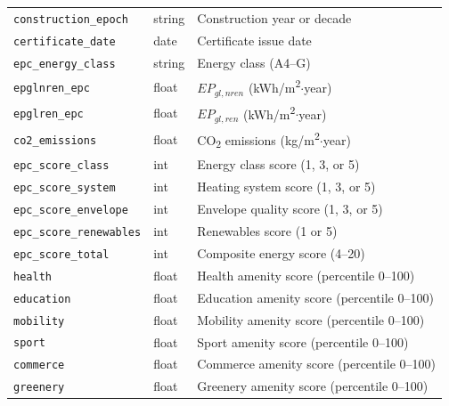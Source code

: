 \documentclass[runningheads,orivec]{llncs}
\begin{document}
\begin{table}[h]
\begin{tabularx}{\textwidth}{llX}
\texttt{construction\_epoch}         & string  & Construction year or decade \\
\texttt{certificate\_date}           & date    & Certificate issue date \\
\texttt{epc\_energy\_class}          & string  & Energy class (A4--G) \\
\texttt{epglnren\_epc}               & float   & $EP_{gl,nren}$ (kWh/m\textsuperscript{2}$\cdot$year) \\
\texttt{epglren\_epc}                & float   & $EP_{gl,ren}$ (kWh/m\textsuperscript{2}$\cdot$year) \\
\texttt{co2\_emissions}              & float   & CO\textsubscript{2} emissions (kg/m\textsuperscript{2}$\cdot$year) \\
\texttt{epc\_score\_class}           & int     & Energy class score (1, 3, or 5) \\
\texttt{epc\_score\_system}          & int     & Heating system score (1, 3, or 5) \\
\texttt{epc\_score\_envelope}        & int     & Envelope quality score (1, 3, or 5) \\
\texttt{epc\_score\_renewables}      & int     & Renewables score (1 or 5) \\
\texttt{epc\_score\_total}           & int     & Composite energy score (4--20) \\
\texttt{health}    & float   & Health amenity score (percentile 0--100) \\
\texttt{education} & float   & Education amenity score (percentile 0--100) \\
\texttt{mobility}  & float   & Mobility amenity score (percentile 0--100) \\
\texttt{sport}     & float   & Sport amenity score (percentile 0--100) \\
\texttt{commerce}  & float   & Commerce amenity score (percentile 0--100) \\
\texttt{greenery}  & float   & Greenery amenity score (percentile 0--100) \\
\bottomrule
\end{tabularx}
\end{table}

\end{document}
